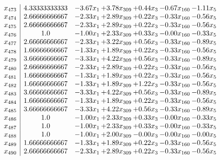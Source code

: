\documentclass[8pt]{article}
\begin{document}
\[\begin{array}{c| c c@{\hskip 2pt} c@{\hskip 2pt} c@{\hskip 2pt} c@{\hskip 2pt} c@{\hskip 2pt} }
 x_{473}   &  4.33333333333 & -3.67 x_{1} & +  3.78 x_{309} & +  0.44 x_{3} & -0.67 x_{160} & -1.11 x_{5}\\
 x_{474}   &  2.66666666667 & -2.33 x_{1} & +  2.89 x_{309} & +  0.22 x_{3} & -0.33 x_{160} & -0.56 x_{5}\\
 x_{475}   &  2.66666666667 & -2.33 x_{1} & +  2.89 x_{309} & +  0.22 x_{3} & -0.33 x_{160} & -0.56 x_{5}\\
 x_{476}   &  1.0 & -1.00 x_{1} & +  2.33 x_{309} & +  0.33 x_{3} & -0.00 x_{160} & -0.33 x_{5}\\
 x_{477}   &  2.66666666667 & -2.33 x_{1} & +  3.22 x_{309} & +  0.56 x_{3} & -0.33 x_{160} & -0.89 x_{5}\\
 x_{478}   &  1.66666666667 & -1.33 x_{1} & +  1.89 x_{309} & +  0.22 x_{3} & -0.33 x_{160} & -0.56 x_{5}\\
 x_{479}   &  3.66666666667 & -3.33 x_{1} & +  4.22 x_{309} & +  0.56 x_{3} & -0.33 x_{160} & -0.89 x_{5}\\
 x_{480}   &  2.66666666667 & -2.33 x_{1} & +  2.89 x_{309} & +  0.22 x_{3} & -0.33 x_{160} & -0.56 x_{5}\\
 x_{481}   &  1.66666666667 & -1.33 x_{1} & +  1.89 x_{309} & +  0.22 x_{3} & -0.33 x_{160} & -0.56 x_{5}\\
 x_{482}   &  1.66666666667 & -1.33 x_{1} & +  1.89 x_{309} & +  1.22 x_{3} & -0.33 x_{160} & -0.56 x_{5}\\
 x_{483}   &  3.66666666667 & -3.33 x_{1} & +  4.22 x_{309} & +  0.56 x_{3} & -0.33 x_{160} & -0.89 x_{5}\\
 x_{484}   &  1.66666666667 & -1.33 x_{1} & +  1.89 x_{309} & +  0.22 x_{3} & -0.33 x_{160} & -0.56 x_{5}\\
 x_{485}   &  3.66666666667 & -3.33 x_{1} & +  4.22 x_{309} & +  0.56 x_{3} & -0.33 x_{160} & -0.89 x_{5}\\
 x_{486}   &  1.0 & -1.00 x_{1} & +  2.33 x_{309} & +  0.33 x_{3} & -0.00 x_{160} & -0.33 x_{5}\\
 x_{487}   &  1.0 & -1.00 x_{1} & +  2.33 x_{309} & +  0.33 x_{3} & -0.00 x_{160} & -0.33 x_{5}\\
 x_{488}   &  1.0 & -1.00 x_{1} & +  2.00 x_{309} & -0.00 x_{3} & -0.00 x_{160} & -0.00 x_{5}\\
 x_{489}   &  1.66666666667 & -1.33 x_{1} & +  1.89 x_{309} & +  0.22 x_{3} & -0.33 x_{160} & -0.56 x_{5}\\
 x_{490}   &  2.66666666667 & -2.33 x_{1} & +  2.89 x_{309} & +  0.22 x_{3} & -0.33 x_{160} & -0.56 x_{5}\\

\end{array}\]
\end{document}
